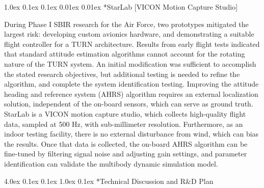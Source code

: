 \documentclass[11pt]{article}
\makeatletter
\renewcommand\section{
\@startsection{section}{1}{\z@}%
{4.0ex \@plus 0.1ex \@minus 0.1ex}%
{1.0ex \@plus 0.1ex}%
{\normalfont\LARGE\bfseries}}
\renewcommand\subsection{
\@startsection{subsection}{2}{\z@}%
{1.0ex \@plus 0.1ex \@minus 0.1ex}%
{0.01ex \@plus 0.01ex}%
{\normalfont\Large\bfseries}}
\makeatother
\begin{document}
\subsection*{StarLab [VICON Motion Capture Studio]}

During Phase I SBIR research for the Air Force, two prototypes mitigated the largest risk: developing custom avionics hardware, and demonstrating a suitable flight controller for a TURN architecture.  Results from early flight tests indicated that standard attitude estimation algorithms cannot account for the rotating nature of the TURN system.  An initial modification was sufficient to accomplish the stated research objectives, but additional testing is needed to refine the algorithm, and complete the system identification testing.  Improving the attitude heading and reference system (AHRS) algorithm requires an external localization solution, independent of the on-board sensors, which can serve as ground truth.  StarLab is a VICON motion capture studio, which collects high-quality flight data, sampled at 500 Hz, with sub-millimeter resolution.  Furthermore, as an indoor testing facility, there is no external disturbance from wind, which can bias the results.  Once that data is collected, the on-board AHRS algorithm can be fine-tuned by filtering signal noise and adjusting gain settings, and parameter identification can validate the multibody dynamic simulation model.








\section*{Technical Discussion and R\&D Plan}  %
\end{document}
